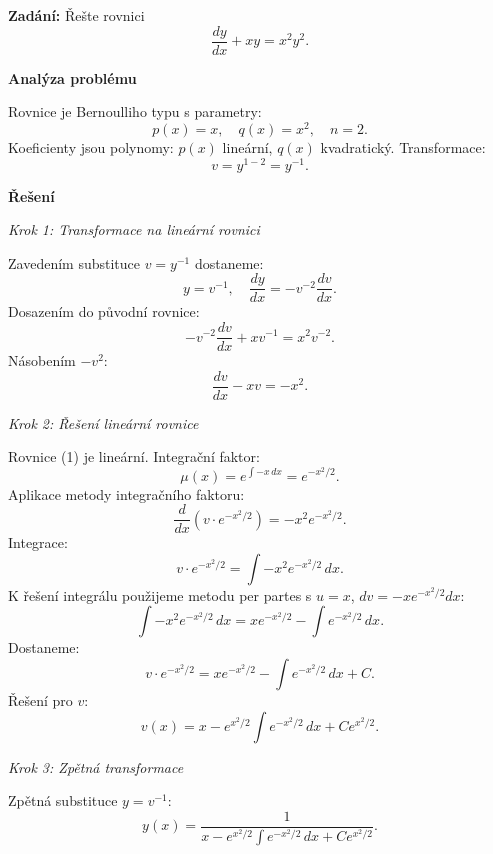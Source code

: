 \begin{example}
    \label{ex:l2-a2-lehky-linearni}
    
    \noindent\textbf{Zadání:} Řešte rovnici
    \[
    \frac{dy}{dx} + xy = x^2 y^2.
    \]
    
    \vspace{1.5\baselineskip}
    
    \noindent\textbf{Analýza problému}
    
    \noindent Rovnice je Bernoulliho typu s parametry:
    \[
    p(x) = x, \quad q(x) = x^2, \quad n = 2.
    \]
    Koeficienty jsou polynomy: $p(x)$ lineární, $q(x)$ kvadratický. Transformace:
    \[
    v = y^{1-2} = y^{-1}.
    \]
    
    \vspace{1.5\baselineskip}
    
    \noindent\textbf{Řešení}
    
    \noindent\textit{Krok 1: Transformace na lineární rovnici}
    
    Zavedením substituce $v = y^{-1}$ dostaneme:
    \[
    y = v^{-1}, \quad \frac{dy}{dx} = -v^{-2}\frac{dv}{dx}.
    \]
    Dosazením do původní rovnice:
    \[
    -v^{-2}\frac{dv}{dx} + xv^{-1} = x^2 v^{-2}.
    \]
    Násobením $-v^2$:
    \[
    \frac{dv}{dx} - xv = -x^2. \tag{1}
    \]
    
    \vspace{1\baselineskip}
    
    \noindent\textit{Krok 2: Řešení lineární rovnice}
    
    Rovnice (1) je lineární. Integrační faktor:
    \[
    \mu(x) = e^{\int -x\,dx} = e^{-x^2/2}.
    \]
    Aplikace metody integračního faktoru:
    \[
    \frac{d}{dx}(v \cdot e^{-x^2/2}) = -x^2 e^{-x^2/2}.
    \]
    Integrace:
    \[
    v \cdot e^{-x^2/2} = \int -x^2 e^{-x^2/2}\,dx.
    \]
    K řešení integrálu použijeme metodu per partes s $u = x$, $dv = -x e^{-x^2/2}dx$:
    \[
    \int -x^2 e^{-x^2/2}\,dx = x e^{-x^2/2} - \int e^{-x^2/2}\,dx.
    \]
    Dostaneme:
    \[
    v \cdot e^{-x^2/2} = x e^{-x^2/2} - \int e^{-x^2/2}\,dx + C.
    \]
    Řešení pro $v$:
    \[
    v(x) = x - e^{x^2/2} \int e^{-x^2/2}\,dx + Ce^{x^2/2}. \tag{2}
    \]
    
    \vspace{1\baselineskip}
    
    \noindent\textit{Krok 3: Zpětná transformace}
    
    Zpětná substituce $y = v^{-1}$:
    \[
    y(x) = \frac{1}{x - e^{x^2/2} \int e^{-x^2/2}\,dx + Ce^{x^2/2}}. \tag{3}
    \]
    

\end{example}
